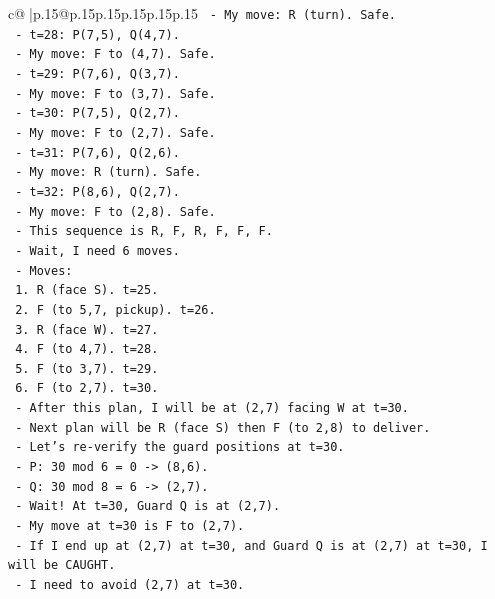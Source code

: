 \documentclass{article}
\begin{document}
{\begin{supertabular}{c@{$\;$}|p{.15\linewidth}@{}p{.15\linewidth}p{.15\linewidth}p{.15\linewidth}p{.15\linewidth}p{.15\linewidth}}
{{{\texttt{       {-} My move: R (turn). Safe.} \\
\texttt{     {-} t=28: P(7,5), Q(4,7).} \\
\texttt{       {-} My move: F to (4,7). Safe.} \\
\texttt{     {-} t=29: P(7,6), Q(3,7).} \\
\texttt{       {-} My move: F to (3,7). Safe.} \\
\texttt{     {-} t=30: P(7,5), Q(2,7).} \\
\texttt{       {-} My move: F to (2,7). Safe.} \\
\texttt{     {-} t=31: P(7,6), Q(2,6).} \\
\texttt{       {-} My move: R (turn). Safe.} \\
\texttt{     {-} t=32: P(8,6), Q(2,7).} \\
\texttt{       {-} My move: F to (2,8). Safe.} \\
\texttt{   {-} This sequence is R, F, R, F, F, F.} \\
\texttt{   {-} Wait, I need 6 moves.} \\
\texttt{   {-} Moves:} \\
\texttt{     1. R (face S). t=25.} \\
\texttt{     2. F (to 5,7, pickup). t=26.} \\
\texttt{     3. R (face W). t=27.} \\
\texttt{     4. F (to 4,7). t=28.} \\
\texttt{     5. F (to 3,7). t=29.} \\
\texttt{     6. F (to 2,7). t=30.} \\
\texttt{   {-} After this plan, I will be at (2,7) facing W at t=30.} \\
\texttt{   {-} Next plan will be R (face S) then F (to 2,8) to deliver.} \\
\texttt{   {-} Let's re{-}verify the guard positions at t=30.} \\
\texttt{     {-} P: 30 mod 6 = 0 {-}> (8,6).} \\
\texttt{     {-} Q: 30 mod 8 = 6 {-}> (2,7).} \\
\texttt{     {-} Wait! At t=30, Guard Q is at (2,7).} \\
\texttt{     {-} My move at t=30 is F to (2,7).} \\
\texttt{     {-} If I end up at (2,7) at t=30, and Guard Q is at (2,7) at t=30, I will be CAUGHT.} \\
\texttt{     {-} I need to avoid (2,7) at t=30.} \\
}}}
\end{supertabular}}
\end{document}
